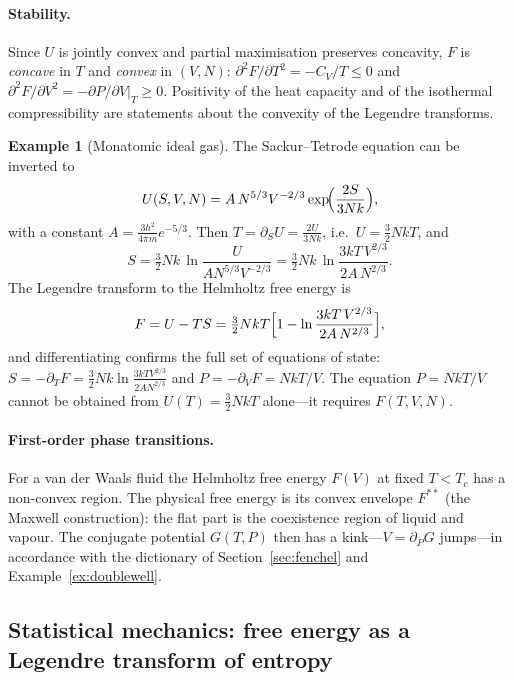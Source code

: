 \documentclass[11pt,a4paper]{article}
\theoremstyle{plain}
\theoremstyle{definition}
\newtheorem{example}[theorem]{Example}
\theoremstyle{remark}
\begin{document}
\paragraph{Stability.}
Since $U$ is jointly convex and partial maximisation preserves concavity,
$F$ is \emph{concave} in $T$ and \emph{convex} in $(V,N)$:
$\partial^2F/\partial T^2=-C_V/T\le0$ and
$\partial^2F/\partial V^2=-\partial P/\partial V|_T\ge0$.  Positivity of the heat
capacity and of the isothermal compressibility are statements about
the convexity of the Legendre transforms.

\begin{example}[Monatomic ideal gas]
The Sackur--Tetrode equation can be inverted to
\[
  U(S,V,N)=A\,N^{5/3}V^{-2/3}\exp\!\Bigl(\frac{2S}{3Nk}\Bigr),
\]
with a constant $A=\tfrac{3h^2}{4\pi m}e^{-5/3}$.  Then
$T=\partial_SU=\frac{2U}{3Nk}$, i.e.\ $U=\tfrac32NkT$, and
\[
  S=\tfrac32Nk\,\ln\frac{U}{AN^{5/3}V^{-2/3}}
   =\tfrac32Nk\,\ln\frac{3kT\,V^{2/3}}{2A\,N^{2/3}} .
\]
The Legendre transform to the Helmholtz free energy is
\[
  F=U-TS=\tfrac32NkT\Bigl[1-\ln\frac{3kT\,V^{2/3}}{2A\,N^{2/3}}\Bigr],
\]
and differentiating confirms the full set of equations of state:
$S=-\partial_TF=\tfrac32Nk\ln\frac{3kTV^{2/3}}{2AN^{2/3}}$ and
$P=-\partial_VF=NkT/V$.  The equation $P=NkT/V$ cannot be obtained from
$U(T)=\tfrac32NkT$ alone---it requires $F(T,V,N)$.
\end{example}

\paragraph{First-order phase transitions.}
For a van der Waals fluid the Helmholtz free energy $F(V)$ at fixed $T<T_c$
has a non-convex region.  The physical free energy is its convex envelope
$F^{**}$ (the Maxwell construction): the flat part is the coexistence region
of liquid and vapour.  The conjugate potential $G(T,P)$ then has a
kink---$V=\partial_PG$ jumps---in accordance with the dictionary of
Section~\ref{sec:fenchel} and Example~\ref{ex:doublewell}.

\subsection{Statistical mechanics: free energy as a Legendre transform of entropy}
\end{document}
